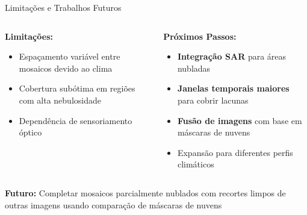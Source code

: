 \documentclass[aspectratio=169,11pt]{beamer}
\begin{document}
\begin{frame}{Limitações e Trabalhos Futuros}
\begin{columns}[T]
    \begin{column}{0.48\textwidth}
        \textbf{\color{accent}Limitações:}
        \begin{itemize}
            \item Espaçamento variável entre mosaicos devido ao clima
            \item Cobertura subótima em regiões com alta nebulosidade
            \item Dependência de sensoriamento óptico
        \end{itemize}
    \end{column}
    \begin{column}{0.48\textwidth}
        \textbf{\color{ufal}Próximos Passos:}
        \begin{itemize}
            \item \textbf{Integração SAR} para áreas nubladas
            \item \textbf{Janelas temporais maiores} para cobrir lacunas
            \item \textbf{Fusão de imagens} com base em máscaras de nuvens
            \item Expansão para diferentes perfis climáticos
        \end{itemize}
    \end{column}
\end{columns}

\vspace{0.3cm}
\begin{center}
    \colorbox{success!10}{\parbox{10cm}{\centering
        \textbf{Futuro:} Completar mosaicos parcialmente nublados com recortes limpos de outras imagens usando comparação de máscaras de nuvens
    }}
\end{center}
\end{frame}
\end{document}
